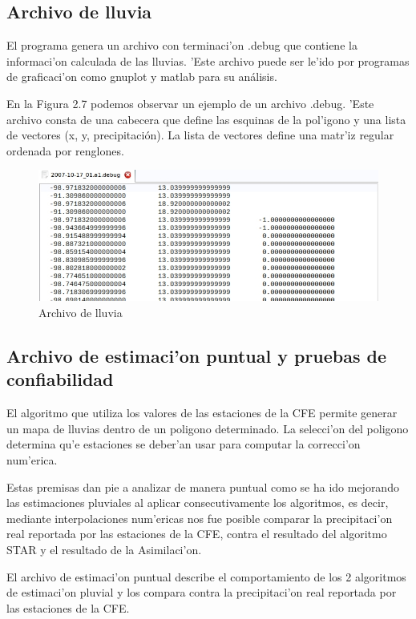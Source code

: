 \subsection{Archivo de lluvia}
El programa genera un archivo con terminaci'on .debug que contiene la informaci'on calculada de las lluvias.
'Este archivo puede ser le'ido por programas de graficaci'on como gnuplot y matlab para su análisis.

En la Figura 2.7 podemos observar un ejemplo de un archivo .debug. 'Este archivo
consta de una cabecera que define las esquinas de la pol'igono y una lista de vectores (x, y, precipitación). La
lista de vectores define una matr'iz regular ordenada por renglones.

\begin{figure}[h!]
 \centering
 \includegraphics[width=160mm,bb=0 0 677 262]{./imagenes/archivodebug.jpg}
 \caption{Archivo de lluvia}
\end{figure}

\subsection{Archivo de estimaci'on puntual y pruebas de confiabilidad}
El algoritmo que utiliza los valores de las estaciones de la CFE permite generar un mapa de lluvias dentro de un poligono
determinado. La selecci'on del poligono determina qu'e estaciones se deber'an usar para computar la correcci'on num'erica.

Estas premisas dan pie a analizar de manera puntual como se ha ido mejorando las estimaciones pluviales al aplicar
consecutivamente los algoritmos, es decir, mediante interpolaciones num'ericas nos fue posible comparar la precipitaci'on
real reportada por las estaciones de la CFE, contra el resultado del algoritmo STAR y el resultado de la Asimilaci'on.


El archivo de estimaci'on puntual describe el comportamiento de los 2 algoritmos de estimaci'on pluvial y los compara
contra la precipitaci'on real reportada por las estaciones de la CFE.

